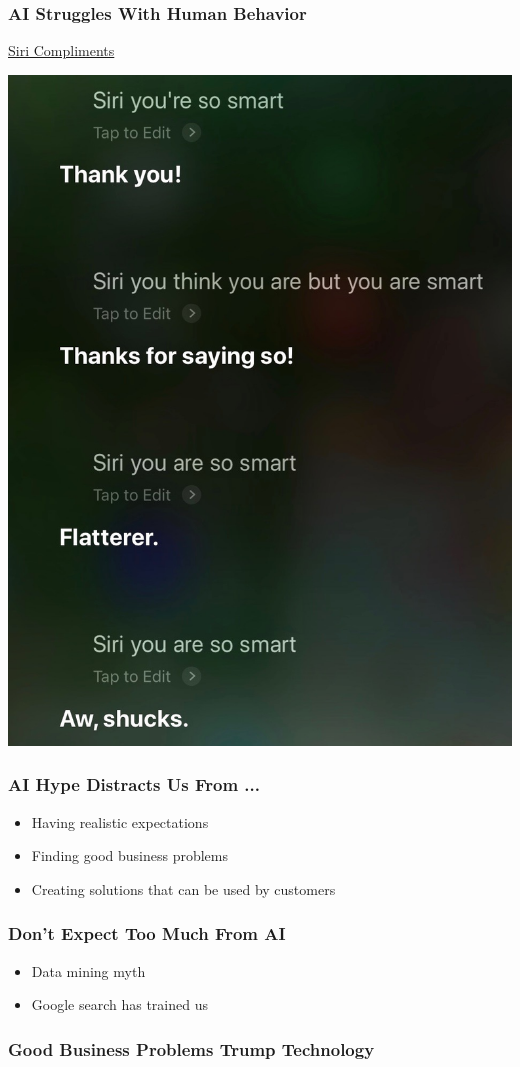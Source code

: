 \begin{frame}
\frametitle{AI Struggles With Human Behavior}
\href{run:figures/siri_smart_sarcasm.m4a}{Siri Compliments}

\begin{center}
\includegraphics[height=0.7\textheight]{figures/siri_transcript.jpeg}
\end{center}
\end{frame}

\begin{frame}
\frametitle{AI Hype Distracts Us From ...}
\begin{itemize}
\item Having realistic expectations
\item Finding good business problems
\item Creating solutions that can be used by customers
\end{itemize}
\end{frame}

\begin{frame}
\frametitle{Don't Expect Too Much From AI}
\begin{itemize}
\item Data mining myth
\item Google search has trained us
\end{itemize}
\end{frame}

\begin{frame}
\frametitle{Good Business Problems Trump Technology}
\end{frame}


